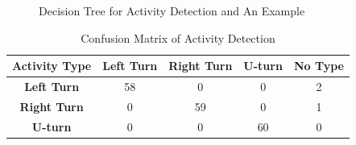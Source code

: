 \documentclass{llncs}
\begin{document}
\begin{figure}[!ht]
	\vspace{-10pt}
	\centering
	\vfil
	\caption{Decision Tree for Activity Detection and An Example}
	\vspace{-10pt}
\end{figure}

\begin{table}
	\vspace{-15pt}
	\label{table_conf}
	\caption{Confusion Matrix of Activity Detection}
	\begin{center}
		\begin{tabular}{| c || c | c | c | c |}
			\hline
			\bfseries Activity Type & \bfseries Left Turn & \bfseries Right Turn & \bfseries U-turn & \bfseries No Type\\
			\hline\hline
			\bfseries Left Turn & 58 & 0 & 0 & 2 \\
			\hline
			\bfseries Right Turn & 0 & 59 & 0 & 1 \\
			\hline
			\bfseries U-turn & 0 & 0 & 60 & 0 \\
			\hline
		\end{tabular}
	\end{center}
\vspace{-20pt}
\end{table}
\end{document}
